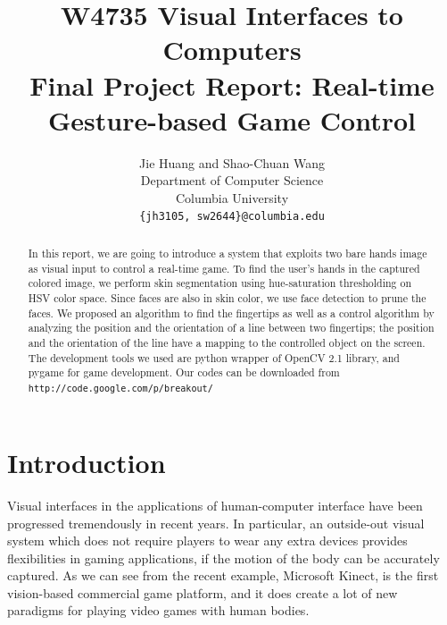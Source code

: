 \documentclass[10pt,twocolumn,letterpaper]{article}
\begin{document}
\title{W4735 Visual Interfaces to Computers\\Final Project Report: Real-time Gesture-based Game Control}
\author{Jie Huang and Shao-Chuan Wang\\
Department of Computer Science\\
Columbia University\\
{\tt\small \{jh3105, sw2644\}@columbia.edu}
}

\maketitle
\thispagestyle{empty}

\begin{abstract}
In this report, we are going to introduce a system that exploits two bare hands image 
as visual input to control a real-time game. To find the user's hands in the captured colored image, 
we perform skin segmentation using hue-saturation 
thresholding on HSV color space. Since faces are also in skin color, we 
use face detection to prune the faces. 
We proposed an algorithm to find the fingertips as well as 
a control algorithm by analyzing the position and the orientation of a 
line between two fingertips; the position and the orientation of the line 
have a mapping to the controlled object on the screen. 
The development tools we used are python wrapper 
of OpenCV 2.1 library, and pygame for game development. Our codes 
can be downloaded from \verb"http://code.google.com/p/breakout/"
\end{abstract}


\section{Introduction}
\label{sec:intro}

Visual interfaces in the applications of human-computer interface 
have been progressed tremendously in recent years. In particular, an outside-out 
visual system \cite{outout} which does not require players to wear 
any extra devices provides flexibilities in gaming applications, if 
the motion of the body can be accurately captured.
As we can see from the recent example, Microsoft Kinect, is the 
first vision-based commercial game platform, and it does 
create a lot of new paradigms for playing video games with human bodies. 
\end{document}
